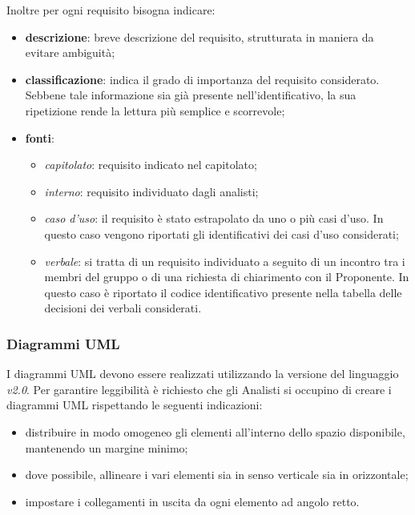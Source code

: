             \noindent Inoltre per ogni requisito bisogna indicare:
            \begin{itemize}
               	\item{\textbf{descrizione}}: breve descrizione del requisito, strutturata in maniera da evitare ambiguità;

               	\item{\textbf{classificazione}}: indica il grado di importanza del requisito considerato. Sebbene tale informazione sia già presente nell'identificativo, la sua ripetizione rende la lettura più semplice e scorrevole;

               	\item{\textbf{fonti}}:
               	\begin{itemize}
               		\item \textit{capitolato}: requisito indicato nel capitolato;
               		\item \textit{interno}: requisito individuato dagli analisti;
               		\item \textit{caso d'uso}: il requisito è stato estrapolato da uno o più casi d'uso. In questo caso vengono riportati gli identificativi dei casi d'uso considerati;
               		\item \textit{verbale}: si tratta di un requisito individuato a seguito di un incontro tra i membri del gruppo o di una richiesta di chiarimento con il Proponente.
               		In questo caso è riportato il codice identificativo presente nella tabella delle decisioni dei verbali considerati.
               	\end{itemize}
            \end{itemize}

        \subsubsection*{Diagrammi UML}
        I diagrammi UML devono essere realizzati utilizzando la versione del linguaggio \textit{v2.0}.
        Per garantire leggibilità è richiesto che gli Analisti si occupino di creare i diagrammi UML
        rispettando le seguenti indicazioni:
        \begin{itemize}
           	\item distribuire in modo omogeneo gli elementi all'interno dello spazio disponibile, mantenendo un margine minimo;
           	\item dove possibile, allineare i vari elementi sia in senso verticale sia in orizzontale;
           	\item impostare i collegamenti in uscita da ogni elemento ad angolo retto.
        \end{itemize}


